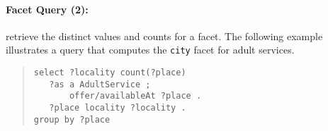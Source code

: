 \paragraph{Facet Query (2):} retrieve the distinct values and counts for a facet.
The following example illustrates a query that computes the \verb|city| facet for adult services.
\begin{quote}
{\footnotesize
\begin{verbatim}
select ?locality count(?place)
   ?as a AdultService ;
       offer/availableAt ?place .
   ?place locality ?locality .
group by ?place
\end{verbatim}}
\end{quote}